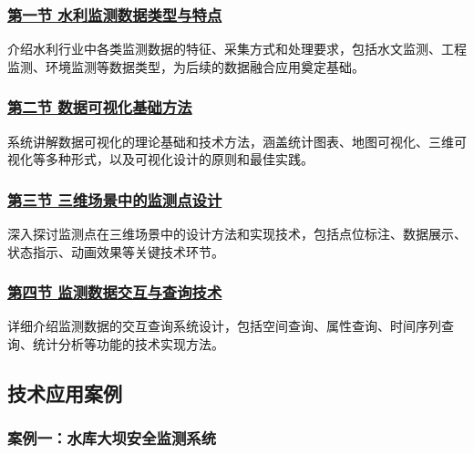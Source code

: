 \subsubsection{\texorpdfstring{\href{section07-01.md}{第一节
水利监测数据类型与特点}}{第一节 水利监测数据类型与特点}}\label{ux7b2cux4e00ux8282-ux6c34ux5229ux76d1ux6d4bux6570ux636eux7c7bux578bux4e0eux7279ux70b9}

介绍水利行业中各类监测数据的特征、采集方式和处理要求，包括水文监测、工程监测、环境监测等数据类型，为后续的数据融合应用奠定基础。

\subsubsection{\texorpdfstring{\href{section07-02.md}{第二节
数据可视化基础方法}}{第二节 数据可视化基础方法}}\label{ux7b2cux4e8cux8282-ux6570ux636eux53efux89c6ux5316ux57faux7840ux65b9ux6cd5}

系统讲解数据可视化的理论基础和技术方法，涵盖统计图表、地图可视化、三维可视化等多种形式，以及可视化设计的原则和最佳实践。

\subsubsection{\texorpdfstring{\href{section07-03.md}{第三节
三维场景中的监测点设计}}{第三节 三维场景中的监测点设计}}\label{ux7b2cux4e09ux8282-ux4e09ux7ef4ux573aux666fux4e2dux7684ux76d1ux6d4bux70b9ux8bbeux8ba1}

深入探讨监测点在三维场景中的设计方法和实现技术，包括点位标注、数据展示、状态指示、动画效果等关键技术环节。

\subsubsection{\texorpdfstring{\href{section07-04.md}{第四节
监测数据交互与查询技术}}{第四节 监测数据交互与查询技术}}\label{ux7b2cux56dbux8282-ux76d1ux6d4bux6570ux636eux4ea4ux4e92ux4e0eux67e5ux8be2ux6280ux672f}

详细介绍监测数据的交互查询系统设计，包括空间查询、属性查询、时间序列查询、统计分析等功能的技术实现方法。

\subsection{技术应用案例}\label{ux6280ux672fux5e94ux7528ux6848ux4f8b}

\subsubsection{案例一：水库大坝安全监测系统}\label{ux6848ux4f8bux4e00ux6c34ux5e93ux5927ux575dux5b89ux5168ux76d1ux6d4bux7cfbux7edf}


